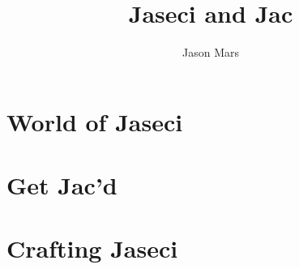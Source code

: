 \documentclass{book}
\title{Jaseci and Jac}
\author{Jason Mars}
\begin{document}








\part{World of Jaseci}
\label{part:jsword}








\part{Get Jac'd}
\label{part:jacd}


\part{Crafting Jaseci}
\label{part:crafting}






\appendix









\end{document}
